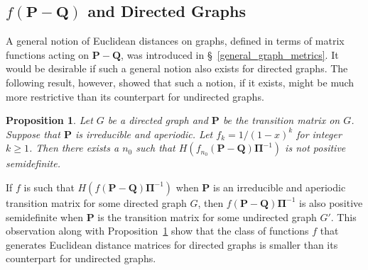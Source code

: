 \documentclass[10pt,twocolumn]{article}
\newtheorem{proposition}[theorem]{Proposition}
\numberwithin{equation}{section}
\begin{document}
\subsection{$f(\mathbf{P} - \mathbf{Q})$ and Directed Graphs}
\label{sec:fmathbfp-mathbfq-dir}
A general notion of Euclidean distances on graphs, defined in terms of
matrix functions acting on $\mathbf{P} - \mathbf{Q}$, was introduced
in \S~\ref{general_graph_metrics}. It would be desirable if such a
general notion also exists for directed graphs. The following result,
however, showed that such a notion, if it exists, might be much more
restrictive than its counterpart for undirected graphs.
\begin{proposition}
  \label{prop:12}
  Let $G$ be a directed graph and $\mathbf{P}$ be the transition
  matrix on $G$. Suppose that $\mathbf{P}$ is irreducible and
  aperiodic. Let $f_k = 1/(1-x)^{k}$ for integer $k \geq 1$. Then
  there exists a $n_0$ such that $H(f_{n_0}(\mathbf{P}
  - \mathbf{Q})\bm{\Pi}^{-1})$ is not positive semidefinite.
\end{proposition}
If $f$ is such that $H(f(\mathbf{P} - \mathbf{Q})\bm{\Pi}^{-1})$
when $\mathbf{P}$ is an irreducible and aperiodic transition
matrix for some directed graph $G$, then $f(\mathbf{P} -
\mathbf{Q})\bm{\Pi}^{-1}$ is also positive semidefinite
when $\mathbf{P}$ is the transition matrix for some undirected
graph $G'$. This observation along with Proposition~\ref{prop:12} show
that the class of functions $f$ that generates Euclidean distance
matrices for directed graphs is smaller than its counterpart
for undirected graphs.
\end{document}
